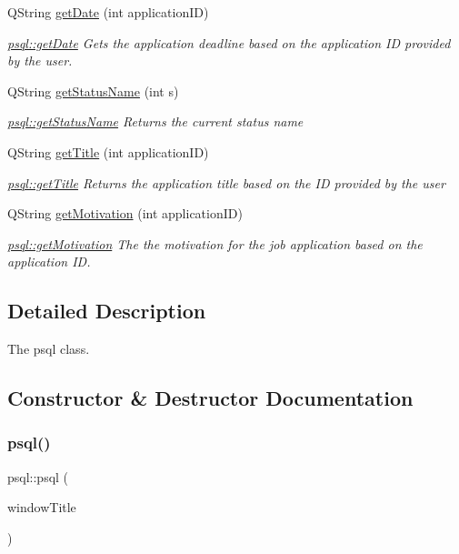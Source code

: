 \begin{DoxyCompactItemize}
Q\+String \hyperlink{classpsql_a561f96bfe7e9d092077712dd6b186af8}{get\+Date} (int application\+ID)
\begin{DoxyCompactList}\small\item\em \hyperlink{classpsql_a561f96bfe7e9d092077712dd6b186af8}{psql\+::get\+Date} Gets the application deadline based on the application ID provided by the user. \end{DoxyCompactList}\item 
Q\+String \hyperlink{classpsql_a5c2a64419a68a258071fd1f9a37c7c09}{get\+Status\+Name} (int s)
\begin{DoxyCompactList}\small\item\em \hyperlink{classpsql_a5c2a64419a68a258071fd1f9a37c7c09}{psql\+::get\+Status\+Name} Returns the current status name \end{DoxyCompactList}\item 
Q\+String \hyperlink{classpsql_ada9e3be3e0866011edf53e30ec510afc}{get\+Title} (int application\+ID)
\begin{DoxyCompactList}\small\item\em \hyperlink{classpsql_ada9e3be3e0866011edf53e30ec510afc}{psql\+::get\+Title} Returns the application title based on the ID provided by the user \end{DoxyCompactList}\item 
Q\+String \hyperlink{classpsql_aca1b2273937491e113089c1547caf49b}{get\+Motivation} (int application\+ID)
\begin{DoxyCompactList}\small\item\em \hyperlink{classpsql_aca1b2273937491e113089c1547caf49b}{psql\+::get\+Motivation} The the motivation for the job application based on the application ID. \end{DoxyCompactList}\end{DoxyCompactItemize}


\subsection{Detailed Description}
The psql class. 

\subsection{Constructor \& Destructor Documentation}
\mbox{\label{classpsql_aaff5fe0931dce097850982e44e6361af}} 
\subsubsection{\texorpdfstring{psql()}{psql()}}
{\footnotesize\ttfamily psql\+::psql (\begin{DoxyParamCaption}\item[{Q\+String}]{window\+Title }\end{DoxyParamCaption})}




